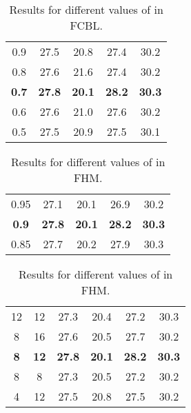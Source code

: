 \documentclass[lettersize,journal]{IEEEtran}
\begin{document}
\begin{table}[t]
    \renewcommand\arraystretch{0.9}
    \centering
    \caption{Results for different values of  in FCBL.}
    \begin{tabular}{c|c|ccc}
    \toprule
     &   &   &   &   \\
    \midrule
    0.9 & 27.5 & 20.8 & 27.4 & 30.2 \\
    0.8 & 27.6 & 21.6 & 27.4 & 30.2 \\
    \textbf{0.7} & \textbf{27.8} & \textbf{20.1} & \textbf{28.2} & \textbf{30.3} \\
    0.6 & 27.6 & 21.0 & 27.6 & 30.2 \\
    0.5 & 27.5 & 20.9 & 27.5 & 30.1 \\
    \bottomrule
    \end{tabular}
    \label{tab:thres}
    \vspace{-4mm}
\end{table}

\begin{table}[t]
        \renewcommand\arraystretch{0.9}
        \centering
        \caption{Results for different values of  in FHM.}
        \begin{tabular}{c|c|ccc}
        \toprule
                 &   &   &   &            \\
        \midrule
        0.95 & 27.1 & 20.1 & 26.9 & 30.2 \\
        \textbf{0.9} & \textbf{27.8} & \textbf{20.1} & \textbf{28.2} & \textbf{30.3} \\
        0.85         & 27.7 &  20.2 & 27.9 & 30.3 \\
        \bottomrule
        \end{tabular}
        \label{tab:beta}
        \vspace{-4mm}
\end{table}

\begin{table}[t]
    \renewcommand\arraystretch{0.9}
    \centering
    \caption{Results for different values of  in FHM.}
    \begin{tabular}{cc|c|ccc}
    \toprule
      &  &    &   &   &   \\
    \midrule
    12 & 12 & 27.3 & 20.4 & 27.2 & 30.3 \\
    8 & 16 & 27.6 & 20.5 & 27.7 & 30.2 \\
    \textbf{8}  & \textbf{12} & \textbf{27.8} & \textbf{20.1} & \textbf{28.2} & \textbf{30.3} \\
    8  & 8 & 27.3 & 20.5 & 27.2 & 30.2 \\
    4  & 12 & 27.5 & 20.8 & 27.5 & 30.2 \\
    \bottomrule
    \end{tabular}
    \label{tab:km}
    \vspace{-4mm}
\end{table}
\end{document}
